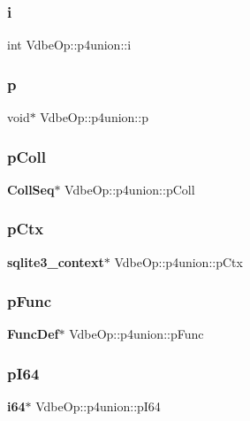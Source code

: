 \mbox{\label{union_vdbe_op_1_1p4union_a67b1d33cd04d43500226f2fc5cd0c6c4}} 
\subsubsection{i}
{\footnotesize\ttfamily int Vdbe\+Op\+::p4union\+::i}

\mbox{\label{union_vdbe_op_1_1p4union_a084b1849db2067d5aa349e3988d2f515}} 
\subsubsection{p}
{\footnotesize\ttfamily void$\ast$ Vdbe\+Op\+::p4union\+::p}

\mbox{\label{union_vdbe_op_1_1p4union_abdd570179d6f6428b96d56b0292f068b}} 
\subsubsection{pColl}
{\footnotesize\ttfamily \textbf{ Coll\+Seq}$\ast$ Vdbe\+Op\+::p4union\+::p\+Coll}

\mbox{\label{union_vdbe_op_1_1p4union_aa1ca37d471aef629b85a8b3c628faa06}} 
\subsubsection{pCtx}
{\footnotesize\ttfamily \textbf{ sqlite3\+\_\+context}$\ast$ Vdbe\+Op\+::p4union\+::p\+Ctx}

\mbox{\label{union_vdbe_op_1_1p4union_a6832dea5d3721f13f718592de2bc9b23}} 
\subsubsection{pFunc}
{\footnotesize\ttfamily \textbf{ Func\+Def}$\ast$ Vdbe\+Op\+::p4union\+::p\+Func}

\mbox{\label{union_vdbe_op_1_1p4union_a6058dda6de49e297bc89e53060e97354}} 
\subsubsection{pI64}
{\footnotesize\ttfamily \textbf{ i64}$\ast$ Vdbe\+Op\+::p4union\+::p\+I64}

